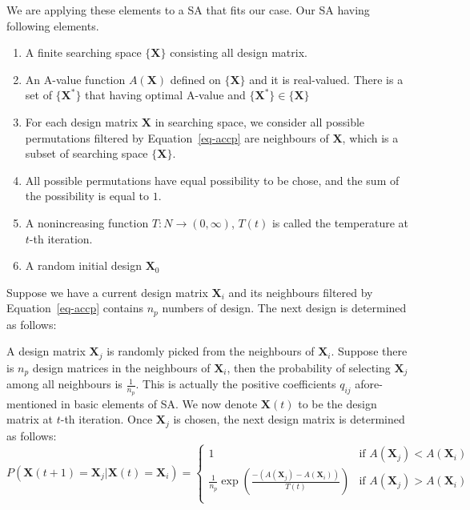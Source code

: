 \documentclass[
  a4paper,
  oneside,
  openany,
  12pt,
  onecolumn]{book}
\providecommand{\tightlist}{%
  \setlength{\itemsep}{0pt}\setlength{\parskip}{0pt}}\usepackage{longtable,booktabs,array}
\theoremstyle{definition}
\theoremstyle{definition}
\theoremstyle{plain}
\theoremstyle{remark}
\begin{document}
We are applying these elements to a SA that fits our case. Our SA having
following elements.

\begin{enumerate}
\def\labelenumi{\arabic{enumi}.}
\tightlist
\item
  A finite searching space \(\{\boldsymbol{X}\}\) consisting all design
  matrix.
\item
  An A-value function \(A(\boldsymbol{X})\) defined on
  \(\{\boldsymbol{X}\}\) and it is real-valued. There is a set of
  \(\{\boldsymbol{X}^*\}\) that having optimal A-value and
  \(\{\boldsymbol{X}^*\}\in \{\boldsymbol{X}\}\)
\item
  For each design matrix \(\boldsymbol{X}\) in searching space, we
  consider all possible permutations filtered by Equation~\ref{eq-accp}
  are neighbours of \(\boldsymbol{X}\), which is a subset of searching
  space \(\{\boldsymbol{X}\}\).
\item
  All possible permutations have equal possibility to be chose, and the
  sum of the possibility is equal to \(1\).
\item
  A nonincreasing function \(T:N\rightarrow (0, \infty)\), \(T(t)\) is
  called the temperature at \(t\)-th iteration.
\item
  A random initial design \(\boldsymbol{X}_0\)
\end{enumerate}

Suppose we have a current design matrix \(\boldsymbol{X}_i\) and its
neighbours filtered by Equation~\ref{eq-accp} contains \(n_p\) numbers
of design. The next design is determined as follows:

A design matrix \(\boldsymbol{X}_j\) is randomly picked from the
neighbours of \(\boldsymbol{X}_i\). Suppose there is \(n_p\) design
matrices in the neighbours of \(\boldsymbol{X}_i\), then the probability
of selecting \(\boldsymbol{X}_j\) among all neighbours is
\(\frac{1}{n_p}\). This is actually the positive coefficients \(q_{ij}\)
afore-mentioned in basic elements of SA. We now denote
\(\boldsymbol{X}(t)\) to be the design matrix at \(t\)-th iteration.
Once \(\boldsymbol{X}_j\) is chosen, the next design matrix is
determined as follows: \[
P(\boldsymbol{X}(t+1)=\boldsymbol{X}_j|\boldsymbol{X}(t)=\boldsymbol{X}_i)
=\begin{cases}
1 & \text{if } A(\boldsymbol{X}_j)<A(\boldsymbol{X}_i) \\
\frac{1}{n_p}\exp(\frac{-(A(\boldsymbol{X}_j)-A(\boldsymbol{X}_i))}{T(t)}) & \text{if } A(\boldsymbol{X}_j)>A(\boldsymbol{X}_i)\\
\end{cases}
\]
\end{document}
